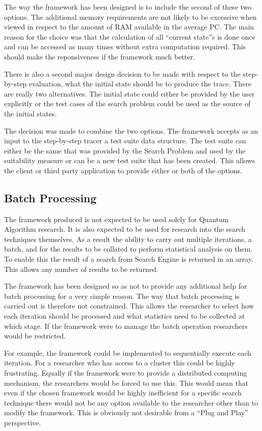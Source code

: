 The way the framework has been designed is to include the second of these two options.
The additional memory requirements are not likely to be excessive when viewed in respect to the amount of RAM available in the average PC.
The main reason for the choice was that the calculation of all ``current state''s is done once and can be accessed as many times without extra computation required.
This should make the reponsiveness if the framework much better.

There is also a second major design decision to be made with respect to the step-by-step evaluation, what the initial state should be to produce the trace.
There are really two alternatives.
The initial state could either be provided by the user explicitly or the test cases of the search problem could be used as the source of the initial  states.

The decision was made to combine the two options.
The framework accepts as an input to the step-by-step tracer a test suite data structure.
The test suite can either be the same that was provided by the Search Problem and used by the suitability measure or can be a new test suite that has been created.
This allows the client or third party application to provide either or both of the options.

\subsection{Batch Processing}
The framework produced is not expected to be used solely for Quantum Algorithm research.
It is also expected to be used for research into the search techniques themselves.
As a result the ability to carry out multiple iterations, a batch, and for the results to be collated to perform statistical analysis on them.
To enable this the result of a search from Search Engine is returned in an array.
This allows any number of results to be returned.

The framework has been designed so as not to provide any additional help for batch processing for a very simple reason.
The way that batch processing is carried out is therefore not constrained.
This allows the researcher to select how each iteration should be processed and what statistics need to be collected at which stage.
If the framework were to manage the batch operation researchers would be restricted.

For example, the framework could be implemented to sequentially execute each iteration.
For a researcher who has access to a cluster this could be highly frustrating.
Equally if the framework were to provide a distributed computing mechanism, the researchers would be forced to use this.
This would mean that even if the chosen framework would be highly inefficient for a specific search technique there would not be any option available to the researcher other than to modify the framework.
This is obviously not desirable from a ``Plug and Play'' perspective.

